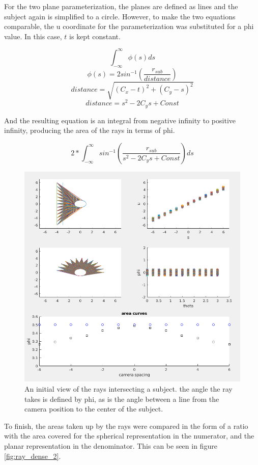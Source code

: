 \documentclass[12pt]{report}
\begin{document}
For the two plane parameterization, the planes are defined as lines and the subject again is simplified to a circle. However, to make the two equations comparable, the u coordinate for the parameterization was substituted for a phi value. In this case, $t$ is kept constant.

$$\int_{-\infty}^{\infty} \phi(s) ds$$
$$\phi(s)=2sin^{-1}(\frac{r_{sub}}{distance})$$
$$distance=\sqrt{(C_x-t)^2+(C_y-s)^2}$$
$$distance=s^2-2C_ys+Const$$

And the resulting equation is an integral from negative infinity to positive infinity, producing the area of the rays in terms of phi.

$$2*\int_{-\infty}^{\infty} sin^{-1}(\frac{r_{sub}}{s^2-2C_ys+Const}) ds$$

\begin{figure}[!ht]
	\centering
	\includegraphics[scale=0.45]{init.png}
	\caption{An initial view of the rays intersecting a subject. the angle the ray takes is defined by phi, as is the angle between a line from the camera position to the center of the subject.}
	\label{fig:ray_dense_1}
\end{figure}

To finish, the areas taken up by the rays were compared in the form of a ratio with the area covered for the spherical representation in the numerator, and the planar representation in the denominator. This can be seen in figure \ref{fig:ray_dense_2}.
\end{document}
